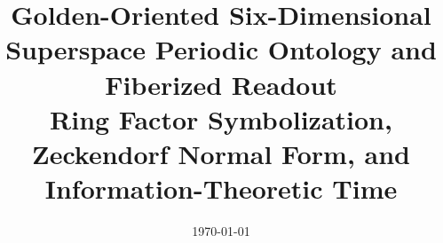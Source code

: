 \documentclass[11pt,letterpaper]{article}
\title{Golden-Oriented Six-Dimensional Superspace Periodic Ontology and Fiberized Readout\\\large Ring Factor Symbolization, Zeckendorf Normal Form, and Information-Theoretic Time}
\author{}
\date{\today}
\begin{document}
\maketitle



















\FloatBarrier
\appendix









\FloatBarrier

\end{document}
